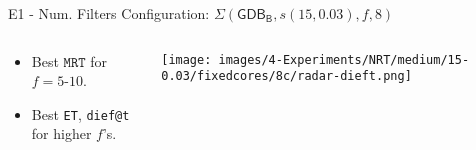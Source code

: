 \begin{frame}{E1 - Num. Filters Configuration: \small{$\Sigma(\mathsf{GDB_B}, s(15, 0.03), f, 8)$}}
\begin{columns} %
    \begin{column}{0.45\textwidth}
    \begin{itemize}
        \item Best $\texttt{MRT}$ for $f=5$-$10$.
        \vspace{1em}
        \item Best \texttt{ET}, \texttt{dief@t} for higher $f$'s.
    \end{itemize}
    \end{column}

    \begin{column}{0.7\textwidth}
        \centering
    \texttt{[image: images/4-Experiments/NRT/medium/15-0.03/fixedcores/8c/radar-dieft.png]}
    \end{column}
\end{columns}

\end{frame}

\begin{comment}
\begin{frame}{E1 - Num. Filters Configuration: \small{$\Sigma(\mathsf{GDB_B}, s(15, 0.03), f, 8)$}}
\begin{itemize}
    \item Check results trace for $\Sigma(\mathsf{GDB_B}, s(15, 0.03), f, 8)$.
    \item \textbf{Higher} number of \textbf{filters} outperform in \textbf{continuous behavior}.
\end{itemize}
\vspace{-0.5cm}
\begin{figure}
    \hspace{-0.70cm}
    \centering
    \texttt{[image: images/4-Experiments/NRT/medium/15-0.03/fixedcores/8c/traces.png]}
    \label{img:exps-medium-15D-8c-trace}
\end{figure}
\end{frame}
\end{comment}

